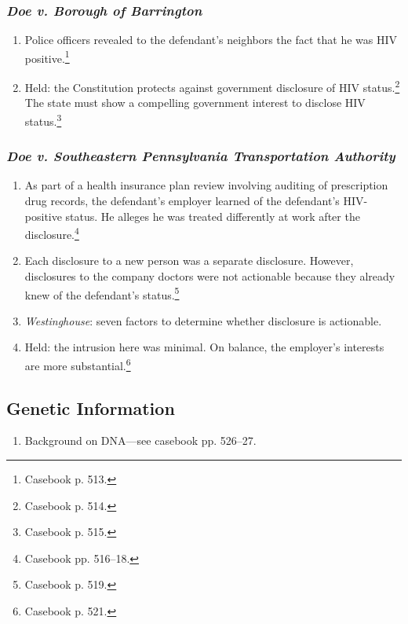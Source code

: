 
\subsubsection{\emph{Doe v. Borough of Barrington}}


\begin{enumerate}
    \item Police officers revealed to the defendant's neighbors the fact that he 
    was HIV positive.\footnote{Casebook p. 513.}
    \item Held: the Constitution protects against government disclosure of HIV 
    status.\footnote{Casebook p. 514.} The state must show a compelling 
    government interest to disclose HIV status.\footnote{Casebook p. 515.}
\end{enumerate}

\subsubsection{\emph{Doe v. Southeastern Pennsylvania Transportation Authority}}


\begin{enumerate}
    \item As part of a health insurance plan review involving auditing of 
    prescription drug records, the defendant's employer learned of the 
    defendant's HIV-positive status. He alleges he was treated differently at 
    work after the disclosure.\footnote{Casebook pp. 516--18.}
    \item Each disclosure to a new person was a separate 
    disclosure. However, disclosures to the company doctors were not actionable 
    because they already knew of the defendant's status.\footnote{Casebook p. 
    519.}
    \item \emph{Westinghouse}: seven factors to determine whether disclosure is 
    actionable.
    \item Held: the intrusion here was minimal. On balance, the employer's 
    interests are more substantial.\footnote{Casebook p. 521.}
\end{enumerate}

\subsection{Genetic Information}

\begin{enumerate}
    \item Background on DNA---see casebook pp. 526--27.
\end{enumerate}

